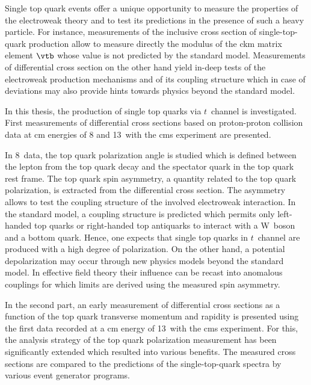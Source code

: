 Single top quark events offer a unique opportunity to measure the properties of the electroweak theory and to test its predictions in the presence of such a heavy particle. For instance, measurements of the inclusive cross section of single-top-quark production allow to measure directly the modulus of the \gls{ckm} matrix element $\vtb$ whose value is not predicted by the standard model. Measurements of differential cross section on the other hand yield in-deep tests of the electroweak production mechanisms and of its coupling structure which in case of deviations may also provide hints towards physics beyond the standard model.

In this thesis, the production of single top quarks via $t$~channel is investigated.  First measurements of differential cross sections based on proton-proton collision data at \acrlong{cm} energies of 8 and 13~\TeV with the \gls{cms} experiment are presented. 

In 8~\TeV data, the top quark polarization angle is studied which is defined between the lepton from the top quark decay and the spectator quark in the top quark rest frame. The top quark spin asymmetry, a quantity related to the top quark polarization, is extracted from the differential cross section. The asymmetry allows to test the coupling structure of the involved electroweak interaction. In the standard model, a  coupling structure is predicted which permits only left-handed top quarks or right-handed top antiquarks to interact with a W~boson and a bottom quark. Hence, one expects that single top quarks in $t$~channel are produced with a high degree of polarization. On the other hand, a potential depolarization may occur through new physics models beyond the standard model. In effective field theory their influence can be recast into anomalous couplings for which limits are derived using the measured spin asymmetry.

In the second part, an early measurement of differential cross sections as a function of the top quark transverse momentum and rapidity is presented using the first data recorded at a \acrlong{cm} energy of 13~\TeV with the \gls{cms} experiment. For this, the analysis strategy of the top quark polarization measurement has been significantly extended which resulted into various benefits.  The measured cross sections are compared to the predictions of the single-top-quark spectra by various event generator programs.

